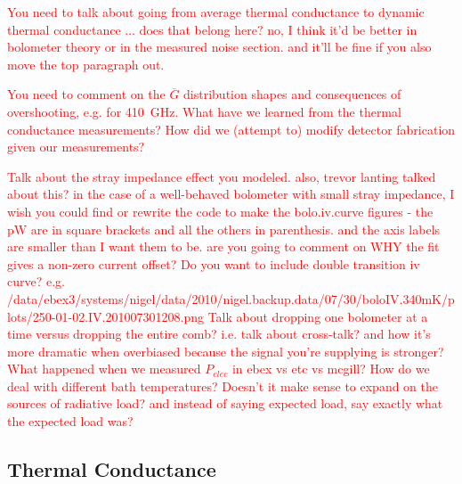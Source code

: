 \textcolor{red}{You need to talk about going from average thermal conductance to dynamic thermal conductance ... does that belong here? no, I think it'd be better in bolometer theory or in the measured noise section. and it'll be fine if you also move the top paragraph out.} 

\textcolor{red}{You need to comment on the $\overline{G}$ distribution shapes and consequences of overshooting, e.g. for 410~GHz.}
\textcolor{red}{What have we learned from the thermal conductance measurements? How did we (attempt to) modify detector fabrication given our measurements?}


\textcolor{red}{Talk about the stray impedance effect you modeled. also, trevor lanting talked about this? in the case of a well-behaved bolometer with small stray impedance, \cite{Lanting2006}  }\textcolor{red}{I wish you could find or rewrite the code to make the bolo.iv.curve figures - the pW are in square brackets and all the others in parenthesis. and the axis labels are smaller than I want them to be.}
\textcolor{red}{are you going to comment on WHY the fit gives a non-zero current offset?}
\textcolor{red}{Do you want to include double transition iv curve? e.g. /data/ebex3/systems/nigel/data/2010/nigel.backup.data/07/30/boloIV.340mK/plots/250-01-02.IV.201007301208.png}
\textcolor{red}{Talk about dropping one bolometer at a time versus dropping the entire comb? i.e. talk about cross-talk? and how it's more dramatic when overbiased because the signal you're supplying is stronger?}
\textcolor{red}{ What happened when we measured $P_{elec}$ in ebex vs etc vs mcgill? How do we deal with different bath temperatures?}
\textcolor{red}{Doesn't it make sense to expand on the sources of radiative load? and instead of saying expected load, say exactly what the expected load was?}

\subsection{Thermal Conductance}
\label{sec:thermal_conductance}

